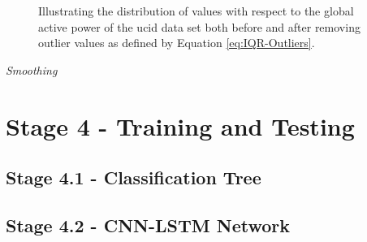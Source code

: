 \begin{adjustwidth}{-1.65cm}{-0.0cm}
\begin{enumerate}[label=Step 3.\arabic*:, leftmargin=*]
    \begin{figure}[hbt!]
        \begin{adjustwidth}{-3.0cm}{-3.0cm}%
                \myfloatalign
                 \quad
                 \quad
                \caption{Illustrating the distribution of values with respect to the global active power of the \gls{ucid} data set both before and after removing outlier values as defined by Equation \ref{eq:IQR-Outliers}.}
        \end{adjustwidth}
    \end{figure}
    
    \noindent \newline \textit{Smoothing}
    \end{enumerate}
\end{adjustwidth}

\section{Stage 4 - Training and Testing}
\label{sec:Methodology:Stage-4}

\subsection{Stage 4.1 - Classification Tree}
\label{subsec:Methodology:Stage-4:Classification-Tree}

\subsection{Stage 4.2 - CNN-LSTM Network}
\label{subsec:Methodology:Stage-4:CNN-LSTM-Network}